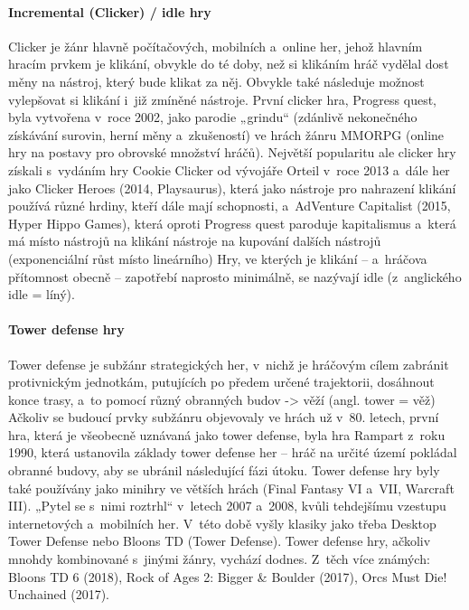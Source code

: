 \documentclass[a4paper]{extarticle}
\begin{document}
\paragraph{Incremental (Clicker) / idle hry}
Clicker je žánr hlavně počítačových, mobilních a~online her, jehož hlavním hracím prvkem je klikání, obvykle do té doby, než si klikáním hráč vydělal dost měny na nástroj, který bude klikat za něj. \cite{idle_games} Obvykle také následuje možnost vylepšovat si klikání i~již zmíněné nástroje.
První clicker hra, Progress quest, \cite{idle_games} byla vytvořena v~roce 2002, jako parodie „grindu“ (zdánlivě nekonečného získávání surovin, herní měny a~zkušeností) ve hrách žánru MMORPG (online hry na postavy pro obrovské množství hráčů). Největší popularitu ale clicker hry získali s~vydáním hry Cookie Clicker od vývojáře Orteil v~roce 2013 a~dále her jako Clicker Heroes (2014, Playsaurus), která jako nástroje pro nahrazení klikání používá různé hrdiny, kteří dále mají schopnosti, a~AdVenture Capitalist (2015, Hyper Hippo Games), která oproti Progress quest paroduje kapitalismus a~která má místo nástrojů na klikání nástroje na kupování dalších nástrojů (exponenciální růst místo lineárního)
Hry, ve kterých je klikání – a~hráčova přítomnost obecně – zapotřebí naprosto minimálně, se nazývají idle (z~anglického idle = líný). 
\paragraph{Tower defense hry}
Tower defense je subžánr strategických her, v~nichž je hráčovým cílem zabránit protivnickým jednotkám, putujících po předem určené trajektorii, dosáhnout konce trasy, a~to pomocí různý obranných budov -> věží (angl. tower = věž)
Ačkoliv se budoucí prvky subžánru objevovaly ve hrách už v~80. letech, první hra, která je všeobecně uznávaná jako tower defense, byla hra Rampart z~roku 1990, která ustanovila základy tower defense her – hráč na určité území pokládal obranné budovy, aby se ubránil následující fázi útoku. Tower defense hry byly také používány jako minihry ve větších hrách (Final Fantasy VI a~VII, Warcraft III). „Pytel se s~nimi roztrhl“ v~letech 2007 a~2008, kvůli tehdejšímu vzestupu internetových a~mobilních her. V~této době vyšly klasiky jako třeba Desktop Tower Defense nebo Bloons TD (Tower Defense).
Tower defense hry, ačkoliv mnohdy kombinované s~jinými žánry, vychází dodnes. Z~těch více známých: Bloons TD 6 (2018), Rock of Ages 2: Bigger \& Boulder (2017), Orcs Must Die! Unchained (2017).
\end{document}
